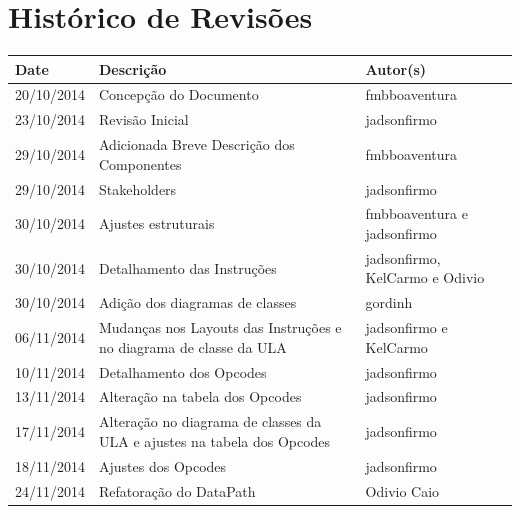\documentclass{report}
\begin{document}

\capa
\newpage
\newpage

\chapter*{Histórico de Revisões}
  \vspace*{1cm}
  \begin{table}[ht]
    \centering
    \begin{tabular}[pos]{|m{2cm} | m{8cm} | m{4cm}|} 
      \hline
      \cellcolor[gray]{0.9}
      \textbf{Date} & \cellcolor[gray]{0.9}\textbf{Descrição} & \cellcolor[gray]{0.9}\textbf{Autor(s)}\\
      \hline 20/10/2014 &  Concepção do Documento & fmbboaventura \\ \hline
      		 23/10/2014 &  Revisão Inicial & jadsonfirmo \\ \hline
      		 29/10/2014 &  Adicionada Breve Descrição dos Componentes & fmbboaventura \\ \hline       
      		 29/10/2014 & Stakeholders & jadsonfirmo \\ \hline
      		 30/10/2014 & Ajustes estruturais & fmbboaventura e jadsonfirmo \\ \hline
      		 30/10/2014 & Detalhamento das Instruções & jadsonfirmo, KelCarmo e Odivio \\ \hline
      		 30/10/2014 & Adição dos diagramas de classes & gordinh \\ \hline
      		 06/11/2014 & Mudanças nos Layouts das Instruções e no diagrama de classe da ULA & jadsonfirmo e KelCarmo \\ \hline
      		 10/11/2014 & Detalhamento dos Opcodes & jadsonfirmo \\ \hline
      		 13/11/2014 & Alteração na tabela dos Opcodes & jadsonfirmo \\ \hline
      		 17/11/2014 & Alteração no diagrama de classes da ULA e ajustes na tabela dos Opcodes & jadsonfirmo \\ \hline
      		 18/11/2014 & Ajustes dos Opcodes & jadsonfirmo \\ \hline
 		 24/11/2014 & Refatoração do DataPath & Odivio Caio \\ \hline

    \end{tabular}
  \end{table}
\end{document}
